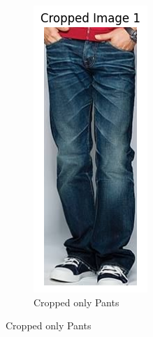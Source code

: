 \begin{figure}[H]
\begin{subfigure}[b]{0.2\textwidth}
        \includegraphics[width=\textwidth]{images/cropped_image.png}
        \caption{Cropped only Pants}
    \end{subfigure}
\end{figure}

